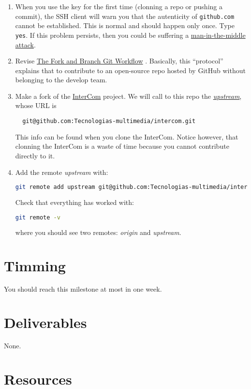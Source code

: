 \begin{enumerate}
\item When you use the key for the first time (clonning a repo or
  pushing a commit), the SSH client will warn you that the autenticity
  of \texttt{github.com} cannot be established. This is normal and
  should happen only once. Type \texttt{yes}. If this problem
  persists, then you could be suffering a
  \href{https://en.wikipedia.org/wiki/Man-in-the-middle_attack}{man-in-the-middle
    attack}.

\item Revise
  \href{https://github.com/vicente-gonzalez-ruiz/fork_and_branch_git_workflow}{The
    Fork and Branch Git Workflow} \cite{Git-workflow}. Basically, this
  ``protocol'' explains that to contribute to an open-source repo
  hosted by GitHub without belonging to the develop team.

\item Make a fork of the
  \href{https://github.com/Tecnologias-multimedia/intercom}{InterCom}
  project. We will call to this repo the
  \href{https://docs.github.com/en/github/getting-started-with-github/github-glossary#upstream}{\emph{upstream}}, whose URL is
\begin{verbatim}
  git@github.com:Tecnologias-multimedia/intercom.git
\end{verbatim}        
  This info can be found when you clone the InterCom. Notice however,
  that clonning the InterCom is a waste of time because you cannot
  contribute directly to it.

\item Add the remote \emph{upstream} with:

  \begin{lstlisting}[language=bash]  
    git remote add upstream git@github.com:Tecnologias-multimedia/intercom.git
  \end{lstlisting}

  Check that everything has worked with:

  \begin{lstlisting}[language=bash]  
    git remote -v
  \end{lstlisting}

  where you should see two remotes: \emph{origin} and \emph{upstream}.

\end{enumerate}

\section{Timming}

You should reach this milestone at most in one week.

\section{Deliverables}

None.

\section{Resources}


